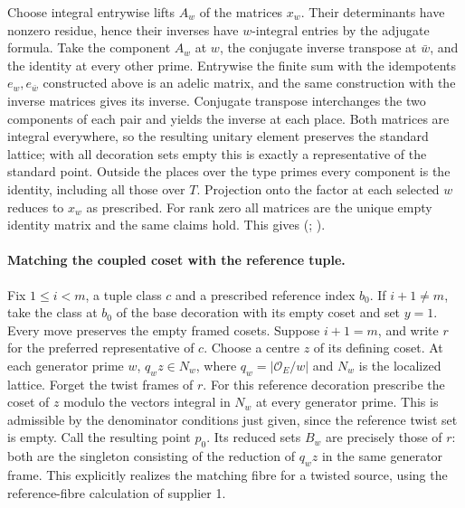 Choose integral entrywise lifts $A_w$ of the matrices $x_w$.
Their determinants have nonzero residue, hence their inverses have
$w$-integral entries by the adjugate formula. Take the component $A_w$
at $w$, the conjugate inverse transpose at $\bar w$, and the identity
at every other prime. Entrywise the finite sum with the idempotents
$e_w,e_{\bar w}$ constructed above is an adelic matrix, and the same
construction with the inverse matrices gives its inverse. Conjugate
transpose interchanges the two components of each pair and yields
the inverse at each place. Both matrices are integral everywhere, so
the resulting unitary element preserves the standard lattice; with
all decoration sets empty this is exactly a representative of the
standard point. Outside the places over the type primes every component
is the identity, including all those over $T$. Projection onto the
factor at each selected $w$ reduces to $x_w$ as prescribed. For rank
zero all matrices are the unique empty identity matrix and the same
claims hold. This gives
(;
).

\paragraph{Matching the coupled coset with the reference tuple.}
Fix $1\le i<m$, a tuple class $c$ and a prescribed reference index $b_0$.
If $i+1\ne m$, take the class at $b_0$ of the base decoration with its
empty coset and set $y=1$. Every move preserves the empty framed cosets.
Suppose $i+1=m$, and write $r$ for the preferred representative of $c$.
Choose a centre $z$ of its defining coset. At each generator prime $w$,
$q_wz\in N_w$, where $q_w=|\mathcal O_E/w|$ and $N_w$ is the
localized lattice. Forget the twist frames of $r$. For this reference
decoration prescribe the coset of $z$ modulo the vectors integral in
$N_w$ at every generator prime. This is admissible by the denominator
conditions just given, since the reference twist set is empty.
Call the resulting point $p_0$. Its reduced sets $B_w$ are precisely those
of $r$: both are the singleton consisting of the reduction of $q_w z$ in
the same generator frame. This explicitly realizes the matching fibre
for a twisted source, using the reference-fibre calculation of supplier 1.

